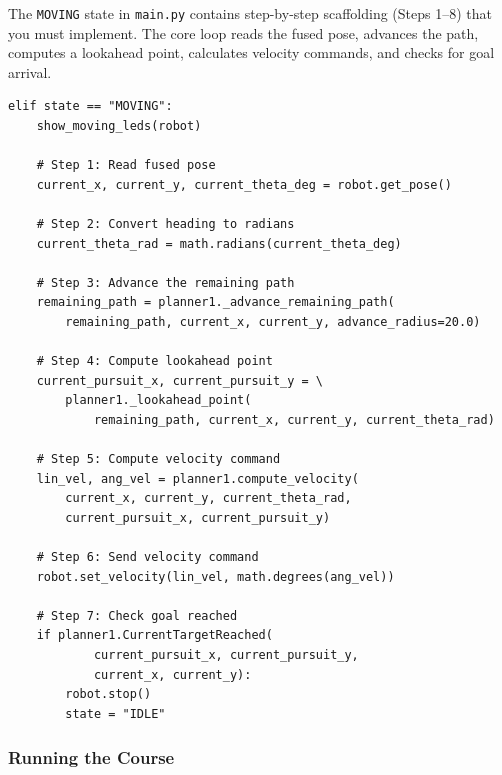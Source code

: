 \documentclass[12pt,letterpaper]{article}
\begin{document}
The \texttt{MOVING} state in \texttt{main.py} contains step-by-step
scaffolding (Steps 1--8) that you must implement.
The core loop reads the fused pose, advances the path, computes a lookahead
point, calculates velocity commands, and checks for goal arrival.

\begin{lstlisting}[style=python, caption={MOVING state skeleton in main.py (complete Steps 1--8)}]
elif state == "MOVING":
    show_moving_leds(robot)

    # Step 1: Read fused pose
    current_x, current_y, current_theta_deg = robot.get_pose()

    # Step 2: Convert heading to radians
    current_theta_rad = math.radians(current_theta_deg)

    # Step 3: Advance the remaining path
    remaining_path = planner1._advance_remaining_path(
        remaining_path, current_x, current_y, advance_radius=20.0)

    # Step 4: Compute lookahead point
    current_pursuit_x, current_pursuit_y = \
        planner1._lookahead_point(
            remaining_path, current_x, current_y, current_theta_rad)

    # Step 5: Compute velocity command
    lin_vel, ang_vel = planner1.compute_velocity(
        current_x, current_y, current_theta_rad,
        current_pursuit_x, current_pursuit_y)

    # Step 6: Send velocity command
    robot.set_velocity(lin_vel, math.degrees(ang_vel))

    # Step 7: Check goal reached
    if planner1.CurrentTargetReached(
            current_pursuit_x, current_pursuit_y,
            current_x, current_y):
        robot.stop()
        state = "IDLE"
\end{lstlisting}

\subsubsection{Running the Course}
\end{document}
